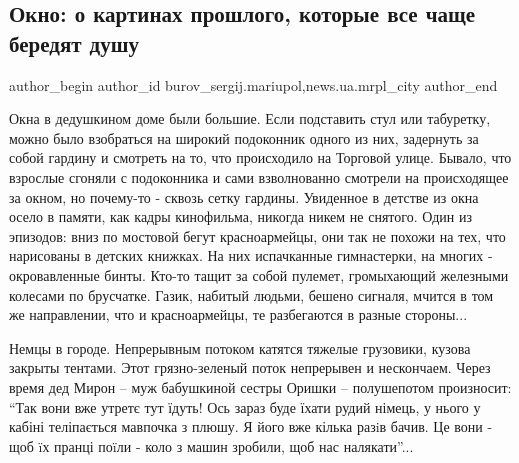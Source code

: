  
 
 
 
 
 
\subsection{Окно: о картинах прошлого, которые все чаще бередят душу}
\label{sec:03_12_2017.stz.news.ua.mrpl_city.1.okno_o_kartinah_proshlogo}
 
\ifcmt
 author_begin
   author_id burov_sergij.mariupol,news.ua.mrpl_city
 author_end
\fi


Окна в дедушкином доме были большие. Если подставить стул или табуретку, можно
было взобраться на широкий подоконник одного из них, задернуть за собой гардину
и смотреть на то, что происходило на Торговой улице. Бывало, что взрослые
сгоняли с подоконника и сами взволнованно смотрели на происходящее за окном, но
почему-то - сквозь сетку гардины. Увиденное в детстве из окна осело в памяти,
как кадры кинофильма, никогда никем не снятого. Один из эпизодов: вниз по
мостовой бегут красноармейцы, они так не похожи на тех, что нарисованы в
детских книжках. На них испачканные гимнастерки, на многих - окровавленные
бинты. Кто-то тащит за собой пулемет, громыхающий железными колесами по
брусчатке. Газик, набитый людьми, бешено сигналя, мчится в том же направлении,
что и красноармейцы, те разбегаются в разные стороны...

Немцы в городе. Непрерывным потоком катятся тяжелые грузовики, кузова закрыты
тентами. Этот грязно-зеленый поток непрерывен и нескончаем. Через время дед
Мирон – муж бабушкиной сестры Оришки – полушепотом произносит: \enquote{Так вони вже
утретє тут їдуть! Ось зараз буде їхати рудий німець, у нього у кабіні
теліпається мавпочка з плюшу. Я його вже кілька разiв бачив. Це вони - щоб ïх
пранці поïли -  коло з машин зробили, щоб нас налякати}...

